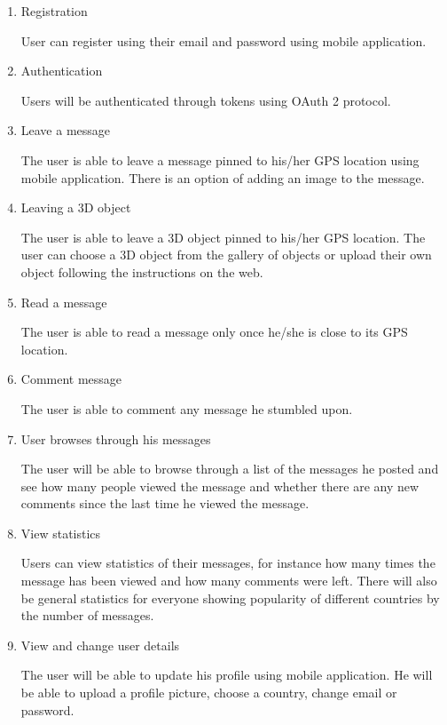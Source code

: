 \documentclass[thesis=M,english]{FITthesis}[2012/10/20]
\begin{document}
\begin{enumerate}
\item{Registration}

User can register using their email and password using mobile application.

\item{Authentication}

Users will be authenticated through tokens using OAuth 2 protocol. 

\item{Leave a message}

The user is able to leave a message pinned to his/her GPS location using mobile application. There is an option of adding an image to the message.

\item{Leaving a 3D object}

The user is able to leave a 3D object pinned to his/her GPS location. The user can choose a 3D object from the gallery of objects or upload their own object following the instructions on the web.

\item{Read a message}

The user is able to read a message only once he/she is close to its GPS location.

\item{Comment message}

The user is able to comment any message he stumbled upon.

\item{User browses through his messages}

The user will be able to browse through a list of the messages he posted and see how many people viewed the message and whether there are any new comments since the last time he viewed the message.

\item{View statistics}

Users can view statistics of their messages, for instance how many times the message has been viewed and how many comments were left. There will also be general statistics for everyone showing popularity of different countries by the number of messages.

\item{View and change user details}

The user will be able to update his profile using mobile application. He will be able to upload a profile picture, choose a country, change email or password.

\end{enumerate}
\end{document}
